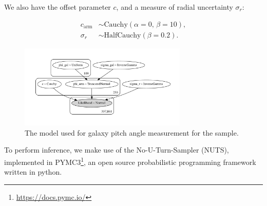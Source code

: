 We also have the offset parameter $c$, and a measure of radial uncertainty $\sigma_r$:

\begin{align}
  c_\mathrm{arm} &\sim \mathrm{Cauchy}(\alpha=0,\,\beta=10),\\
  \sigma_r &\sim \mathrm{HalfCauchy}(\beta=0.2).
\end{align}

\begin{figure}
  \includegraphics[width=8cm]{plots/plots_n109d1000t500/model.pdf}
  \caption{The model used for galaxy pitch angle measurement for the sample.}
  \label{fig:ad-cot-test}
\end{figure}

To perform inference, we make use of the No-U-Turn-Sampler (NUTS), implemented in PYMC3\footnote{\url{https://docs.pymc.io/}}, an open source probabilistic programming framework written in python. 
